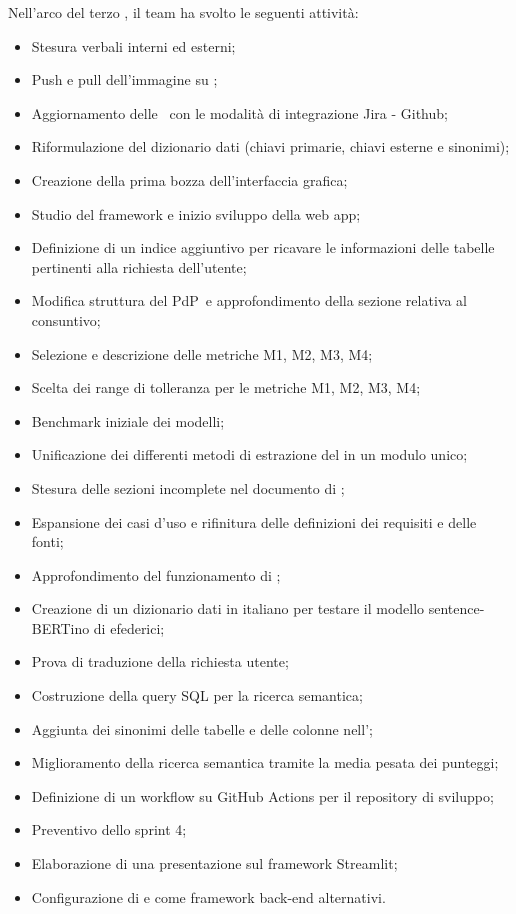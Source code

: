 Nell'arco del terzo , il team ha svolto le seguenti attività:
\begin{itemize}
    \item Stesura verbali interni ed esterni;
    \item Push e pull dell'immagine  su ;
    \item Aggiornamento delle \NdP\ con le modalità di integrazione Jira - Github;
    \item Riformulazione del dizionario dati (chiavi primarie, chiavi esterne e sinonimi);
    \item Creazione della prima bozza dell'interfaccia grafica;
    \item Studio del framework  e inizio sviluppo della web app;
    \item Definizione di un indice aggiuntivo per ricavare le informazioni delle tabelle pertinenti alla richiesta dell'utente;	
    \item Modifica struttura del PdP\ e approfondimento della sezione relativa al consuntivo;
    \item Selezione e descrizione delle metriche M1, M2, M3, M4;
    \item Scelta dei range di tolleranza per le metriche M1, M2, M3, M4;
    \item Benchmark iniziale dei modelli;
    \item Unificazione dei differenti metodi di estrazione del  in un modulo unico;
    \item Stesura delle sezioni incomplete nel documento di \AdR;
    \item Espansione dei casi d'uso e rifinitura delle definizioni dei requisiti e delle fonti;
    \item Approfondimento del funzionamento di ;
    \item Creazione di un dizionario dati in italiano per testare il modello sentence-BERTino di efederici;
    \item Prova di traduzione della richiesta utente;
    \item Costruzione della query SQL per la ricerca semantica;
    \item Aggiunta dei sinonimi delle tabelle e delle colonne nell';
    \item Miglioramento della ricerca semantica tramite la media pesata dei punteggi;
    \item Definizione di un workflow su GitHub Actions per il repository di sviluppo;
    \item Preventivo dello sprint 4;
    \item Elaborazione di una presentazione sul framework Streamlit;
    \item Configurazione di  e  come framework back-end alternativi.
\end{itemize}

